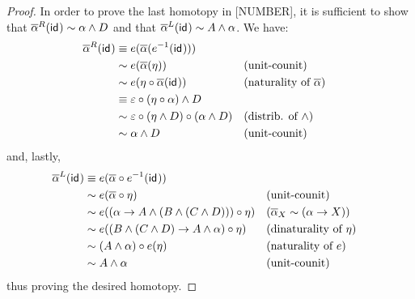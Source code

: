 \documentclass{article}
\renewcommand{\smash}{\wedge}
\renewcommand{\epsilon}{\varepsilon}
\renewcommand{\o}{\ensuremath{\circ}}
\newcommand{\sy}{^{-1}}
\newcommand{\alphabar}{\overline{\alpha}}
\begin{document}
\begin{proof}
	In order to prove the last homotopy in [NUMBER], it is sufficient to show that $\alphabar^R(\idfunc) \sim \alpha \smash D$ and that $\alphabar^L(\idfunc) \sim A \smash \alpha$. We have:
	\begin{align*}
		\alphabar^R(\idfunc)
		&\judgeq e(\alphabar (e\sy(\idfunc)))\\
		&\sim e (\alphabar (\eta)) &&\text{(unit-counit)}\\
		&\sim e (\eta \o \alphabar(\idfunc)) &&\text{(naturality of $\alphabar$)}\\
		&\judgeq \epsilon \o (\eta \o \alpha) \smash D\\
		&\sim \epsilon \o (\eta \smash D) \o (\alpha \smash D) &&\text{(distrib. of $\smash$)}\\
		&\sim \alpha \smash D &&\text{(unit-counit)}
	\end{align*}
	and, lastly,
	\begin{align*}
		\alphabar^L(\idfunc)
		&\judgeq e(\alphabar \o e\sy(\idfunc))\\
		&\sim e(\alphabar \o \eta) &&\text{(unit-counit)}\\
		&\sim e((\alpha \to A \smash (B \smash (C \smash D))) \o \eta) &&\text{($\alphabar_X \sim (\alpha \to X)$)}\\
		&\sim e((B \smash (C \smash D) \to A \smash \alpha) \o \eta) &&\text{(dinaturality of $\eta$)}\\
		&\sim (A \smash \alpha) \o e(\eta) &&\text{(naturality of $e$)}\\
		&\sim A \smash \alpha &&\text{(unit-counit)}
	\end{align*}
	thus proving the desired homotopy.
\end{proof}
\end{document}
